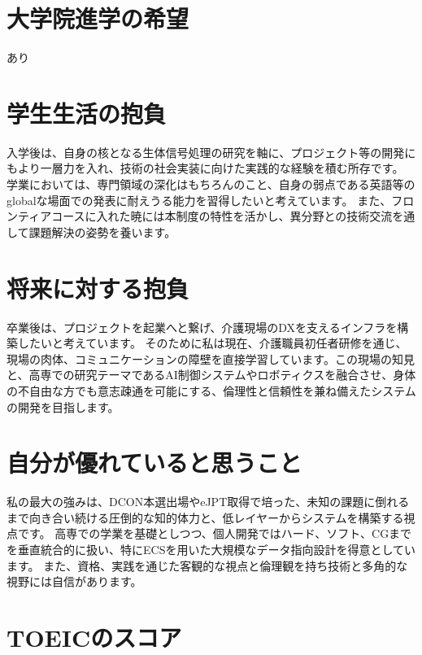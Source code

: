 \documentclass[11pt,a4paper]{ltjsarticle}
\begin{document}
\section{大学院進学の希望}
    あり

\section{学生生活の抱負}
入学後は、自身の核となる生体信号処理の研究を軸に、プロジェクト等の開発にもより一層力を入れ、技術の社会実装に向けた実践的な経験を積む所存です。
学業においては、専門領域の深化はもちろんのこと、自身の弱点である英語等のglobalな場面での発表に耐えうる能力を習得したいと考えています。
また、フロンティアコースに入れた暁には本制度の特性を活かし、異分野との技術交流を通して課題解決の姿勢を養います。


\section{将来に対する抱負}
卒業後は、プロジェクトを起業へと繋げ、介護現場のDXを支えるインフラを構築したいと考えています。
そのために私は現在、介護職員初任者研修を通じ、現場の肉体、コミュニケーションの障壁を直接学習しています。この現場の知見と、高専での研究テーマであるAI制御システムやロボティクスを融合させ、身体の不自由な方でも意志疎通を可能にする、倫理性と信頼性を兼ね備えたシステムの開発を目指します。


\section{自分が優れていると思うこと}
私の最大の強みは、DCON本選出場やeJPT取得で培った、未知の課題に倒れるまで向き合い続ける圧倒的な知的体力と、低レイヤーからシステムを構築する視点です。
高専での学業を基礎としつつ、個人開発ではハード、ソフト、CGまでを垂直統合的に扱い、特にECSを用いた大規模なデータ指向設計を得意としています。
また、資格、実践を通じた客観的な視点と倫理観を持ち技術と多角的な視野には自信があります。

\section{TOEICのスコア}
\end{document}
